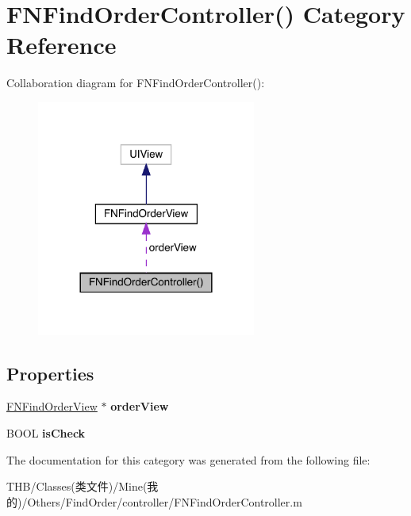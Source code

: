 \hypertarget{category_f_n_find_order_controller_07_08}{}\section{F\+N\+Find\+Order\+Controller() Category Reference}
\label{category_f_n_find_order_controller_07_08}


Collaboration diagram for F\+N\+Find\+Order\+Controller()\+:\nopagebreak
\begin{figure}[H]
\begin{center}
\leavevmode
\includegraphics[width=204pt]{category_f_n_find_order_controller_07_08__coll__graph}
\end{center}
\end{figure}
\subsection*{Properties}
\begin{DoxyCompactItemize}
\item 
\mbox{\label{category_f_n_find_order_controller_07_08_a87ff824b5013164c799b1fac8bcc0598}} 
\mbox{\hyperlink{interface_f_n_find_order_view}{F\+N\+Find\+Order\+View}} $\ast$ {\bfseries order\+View}
\item 
\mbox{\label{category_f_n_find_order_controller_07_08_ade0667320667cc2a7a8835ba339cac9b}} 
B\+O\+OL {\bfseries is\+Check}
\end{DoxyCompactItemize}


The documentation for this category was generated from the following file\+:\begin{DoxyCompactItemize}
\item 
T\+H\+B/\+Classes(类文件)/\+Mine(我的)/\+Others/\+Find\+Order/controller/F\+N\+Find\+Order\+Controller.\+m\end{DoxyCompactItemize}

